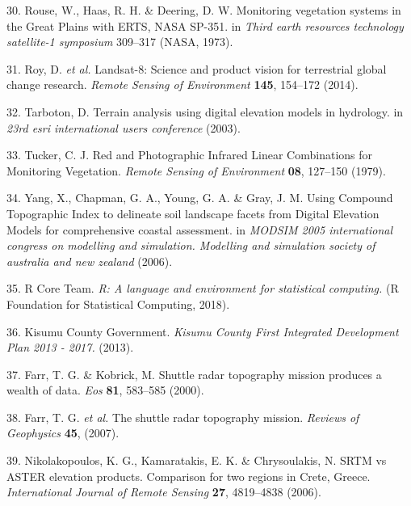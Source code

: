 \documentclass[12pt,oneside]{article}
\begin{document}
\leavevmode\hypertarget{ref-Rouse_et_al_1973}{}%
30. Rouse, W., Haas, R. H. \& Deering, D. W. Monitoring vegetation systems in the Great Plains with ERTS, NASA SP-351. in \emph{Third earth resources technology satellite-1 symposium} 309--317 (NASA, 1973).

\leavevmode\hypertarget{ref-Roy_et_al_2014}{}%
31. Roy, D. \emph{et al.} Landsat-8: Science and product vision for terrestrial global change research. \emph{Remote Sensing of Environment} \textbf{145}, 154--172 (2014).

\leavevmode\hypertarget{ref-Tarboton_2003}{}%
32. Tarboton, D. Terrain analysis using digital elevation models in hydrology. in \emph{23rd esri international users conference} (2003).

\leavevmode\hypertarget{ref-Tucker_1979}{}%
33. Tucker, C. J. Red and Photographic Infrared Linear Combinations for Monitoring Vegetation. \emph{Remote Sensing of Environment} \textbf{08}, 127--150 (1979).

\leavevmode\hypertarget{ref-Yang_et_al_2006}{}%
34. Yang, X., Chapman, G. A., Young, G. A. \& Gray, J. M. Using Compound Topographic Index to delineate soil landscape facets from Digital Elevation Models for comprehensive coastal assessment. in \emph{MODSIM 2005 international congress on modelling and simulation. Modelling and simulation society of australia and new zealand} (2006).

\leavevmode\hypertarget{ref-RCoreTeam_2018}{}%
35. R Core Team. \emph{R: A language and environment for statistical computing.} (R Foundation for Statistical Computing, 2018).

\leavevmode\hypertarget{ref-KisumuCountyGovernment_2013}{}%
36. Kisumu County Government. \emph{Kisumu County First Integrated Development Plan 2013 - 2017.} (2013).

\leavevmode\hypertarget{ref-Farr_et_al_2000}{}%
37. Farr, T. G. \& Kobrick, M. Shuttle radar topography mission produces a wealth of data. \emph{Eos} \textbf{81}, 583--585 (2000).

\leavevmode\hypertarget{ref-Farr_et_al_2007}{}%
38. Farr, T. G. \emph{et al.} The shuttle radar topography mission. \emph{Reviews of Geophysics} \textbf{45}, (2007).

\leavevmode\hypertarget{ref-Nikolakopoulos_et_al_2006}{}%
39. Nikolakopoulos, K. G., Kamaratakis, E. K. \& Chrysoulakis, N. SRTM vs ASTER elevation products. Comparison for two regions in Crete, Greece. \emph{International Journal of Remote Sensing} \textbf{27}, 4819--4838 (2006).
\end{document}
